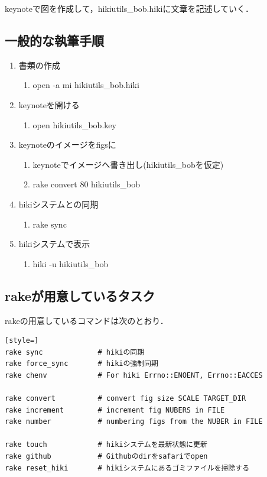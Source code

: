 keynoteで図を作成して，hikiutils\_bob.hikiに文章を記述していく．

\subsection{一般的な執筆手順}
\begin{enumerate}
\item 書類の作成
\begin{enumerate}
\item open -a mi hikiutils\_bob.hiki
\end{enumerate}
\item keynoteを開ける
\begin{enumerate}
\item open hikiutils\_bob.key
\end{enumerate}
\item keynoteのイメージをfigsに
\begin{enumerate}
\item keynoteでイメージへ書き出し(hikiutils\_bobを仮定)
\item rake convert 80 hikiutils\_bob
\end{enumerate}
\item hikiシステムとの同期
\begin{enumerate}
\item rake sync
\end{enumerate}
\item hikiシステムで表示
\begin{enumerate}
\item hiki -u hikiutils\_bob
\end{enumerate}
\end{enumerate}
\subsection{rakeが用意しているタスク}
rakeの用意しているコマンドは次のとおり．
\begin{lstlisting}[style=]
rake sync             # hikiの同期
rake force_sync       # hikiの強制同期
rake chenv            # For hiki Errno::ENOENT, Errno::EACCES

rake convert          # convert fig size SCALE TARGET_DIR
rake increment        # increment fig NUBERS in FILE
rake number           # numbering figs from the NUBER in FILE

rake touch            # hikiシステムを最新状態に更新
rake github           # Githubのdirをsafariでopen
rake reset_hiki       # hikiシステムにあるゴミファイルを掃除する
\end{lstlisting}
